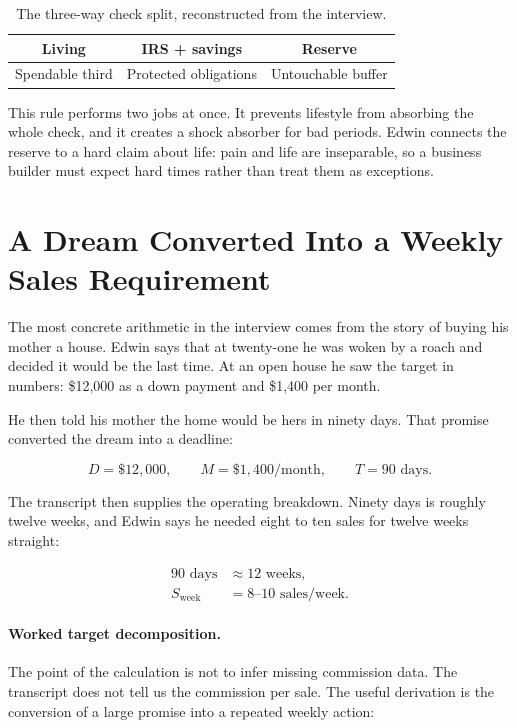 \begin{table}
\centering
\begin{tabular}{|c|c|c|}
\hline
Living & IRS + savings & Reserve \\
\hline
Spendable third & Protected obligations & Untouchable buffer \\
\hline
\end{tabular}
\caption{The three-way check split, reconstructed from the interview.}
\end{table}

This rule performs two jobs at once. It prevents lifestyle from absorbing the whole check, and it creates a shock absorber for bad periods. Edwin connects the reserve to a hard claim about life: pain and life are inseparable, so a business builder must expect hard times rather than treat them as exceptions.

\section{A Dream Converted Into a Weekly Sales Requirement}

The most concrete arithmetic in the interview comes from the story of buying his mother a house. Edwin says that at twenty-one he was woken by a roach and decided it would be the last time. At an open house he saw the target in numbers: \$12,000 as a down payment and \$1,400 per month.

He then told his mother the home would be hers in ninety days. That promise converted the dream into a deadline:

\begin{equation}
D=\$12{,}000,
\qquad
M=\$1{,}400/\text{month},
\qquad
T=90\text{ days}.
\end{equation}

The transcript then supplies the operating breakdown. Ninety days is roughly twelve weeks, and Edwin says he needed eight to ten sales for twelve weeks straight:

\begin{align}
90\text{ days} &\approx 12\text{ weeks},\\
S_{\text{week}} &= 8\text{--}10\text{ sales/week}.
\end{align}

\paragraph{Worked target decomposition.}
The point of the calculation is not to infer missing commission data. The transcript does not tell us the commission per sale. The useful derivation is the conversion of a large promise into a repeated weekly action:

